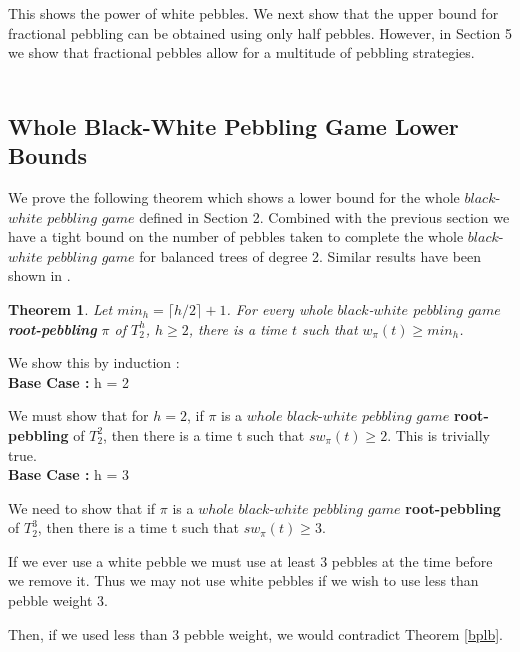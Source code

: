 \documentclass[12pt]{article}
\newtheorem{theorem}{Theorem}[subsection]
\begin{document}
This shows the power of white pebbles. We next show that the upper bound for fractional pebbling can be obtained using only half pebbles. However, in Section 5 we show that fractional pebbles allow for a multitude of pebbling strategies. \\\\






\subsection{Whole Black-White Pebbling Game Lower Bounds} 

We prove the following theorem which shows a lower bound for the whole $black$-$white$ $pebbling$ $game$ defined in Section 2. Combined with the previous section we have a tight bound on the number of pebbles taken to complete the whole $black$-$white$ $pebbling$ $game$ for balanced trees of degree 2. Similar results have been shown in \cite{c:pebjournal}.\\

\begin{theorem}
Let $min_h = \lceil h/2 \rceil + 1$.
For every whole $black$-$white$ $pebbling$ $game$ {\bf root-pebbling} $\pi$ of $T^h_2$, $h \geq 2$, there is a time $t$ such
that $w_\pi(t) \ge min_h$.
\end{theorem}

\noindent
We show this by induction : \\

\noindent
{\bf Base Case :} h = 2

We must show that for $h=2$, if $\pi$ is a $whole$ $black$-$white$ $pebbling$ $game$ {\bf root-pebbling} of $T_2^2$, then there is a time t such that $sw_\pi(t) \geq 2$. This is trivially true.\\

\noindent
{\bf Base Case :} h = 3

We need to show that if $\pi$ is a $whole$ $black$-$white$ $pebbling$ $game$ {\bf root-pebbling} of $T_2^3$, then there is a time t such that $sw_\pi(t) \geq 3$.
 
If we ever use a white pebble we must use at least 3 pebbles at the time before we remove it. Thus we may not use white pebbles if we wish to use less than pebble weight 3.

Then, if we used less than 3 pebble weight, we would contradict Theorem \ref{bplb}.\\
\end{document}

